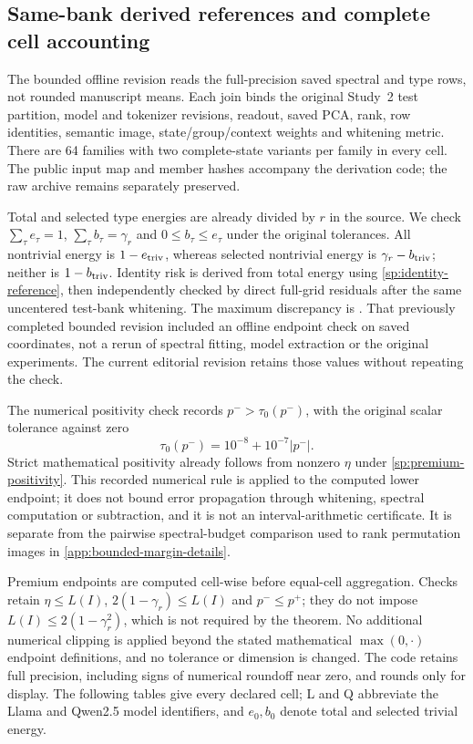 \subsection{Same-bank derived references and complete cell accounting}
\label{app:bounded-risk-details}
The bounded offline revision reads the full-precision saved spectral and type rows, not rounded manuscript means. Each join binds the original Study~2 test partition, model and tokenizer revisions, readout, saved PCA, rank, row identities, semantic image, state/group/context weights and whitening metric. There are 64 families with two complete-state variants per family in every cell. The public input map and member hashes accompany the derivation code; the raw archive remains separately preserved.

Total and selected type energies are already divided by $r$ in the source. We check $\sum_\tau e_\tau=1$, $\sum_\tau b_\tau=\gamma_r$ and $0\le b_\tau\le e_\tau$ under the original tolerances. All nontrivial energy is $1-e_{\rm triv}$, whereas selected nontrivial energy is $\gamma_r-b_{\rm triv}$; neither is $1-b_{\rm triv}$. Identity risk is derived from total energy using \cref{sp:identity-reference}, then independently checked by direct full-grid residuals after the same uncentered test-bank whitening. The maximum discrepancy is \BoundedIdentityMaxError. That previously completed bounded revision included an offline endpoint check on saved coordinates, not a rerun of spectral fitting, model extraction or the original experiments. The current editorial revision retains those values without repeating the check.

The numerical positivity check records $p^->\tau_0(p^-)$, with the original scalar tolerance against zero
\[
 \tau_0(p^-)=10^{-8}+10^{-7}|p^-|.
\]
Strict mathematical positivity already follows from nonzero $\eta$ under \cref{sp:premium-positivity}. This recorded numerical rule is applied to the computed lower endpoint; it does not bound error propagation through whitening, spectral computation or subtraction, and it is not an interval-arithmetic certificate. It is separate from the pairwise spectral-budget comparison used to rank permutation images in \cref{app:bounded-margin-details}.

Premium endpoints are computed cell-wise before equal-cell aggregation. Checks retain $\eta\le L(I)$, $2(1-\gamma_r)\le L(I)$ and $p^-\le p^+$; they do not impose $L(I)\le2(1-\gamma_r^2)$, which is not required by the theorem. No additional numerical clipping is applied beyond the stated mathematical $\max(0,\cdot)$ endpoint definitions, and no tolerance or dimension is changed. The code retains full precision, including signs of numerical roundoff near zero, and rounds only for display. The following tables give every declared cell; L and Q abbreviate the Llama and Qwen2.5 model identifiers, and $e_0,b_0$ denote total and selected trivial energy.

